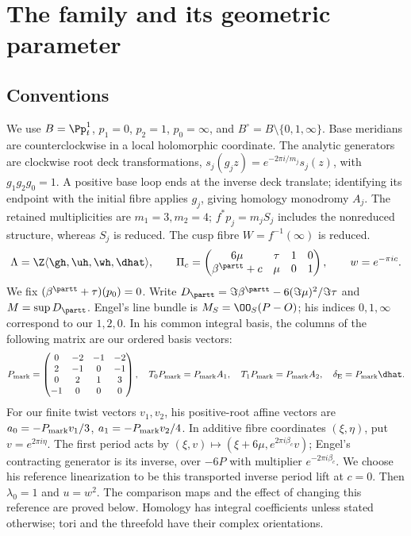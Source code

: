 \section{The family and its geometric parameter}\label{sec:family}
\subsection{Conventions}
\begin{definition}\label{def:conventions}
We use $B=\Pp^1_t$, $p_1=0$, $p_2=1$, $p_0=\infty$, and
$B^\circ=B\setminus\{0,1,\infty\}$. Base meridians are counterclockwise
in a local holomorphic coordinate. The analytic generators are clockwise
root deck transformations, $s_j(g_jz)=e^{-2\pi i/m_j}s_j(z)$, with
$g_1g_2g_0=1$. A positive base loop ends at the inverse deck translate;
identifying its endpoint with the initial fibre applies $g_j$, giving
homology monodromy $A_j$. The retained multiplicities are $m_1=3,m_2=4$;
$f^*p_j=m_jS_j$ includes the nonreduced structure, whereas $S_j$ is reduced.
The cusp fibre $W=f^{-1}(\infty)$ is reduced.
\[
 \Lambda=\Z\langle\gh,\uh,\wh,\dhat\rangle,\qquad
 \Pi_c=\begin{pmatrix}6\mu&\tau&1&0\\\beta^{\partt}+c&\mu&0&1\end{pmatrix},
 \qquad w=e^{-\pi ic}.
\]
We fix $(\beta^{\partt}+\tau)(p_0)=0$. Write
$D_{\partt}=\Im\beta^{\partt}-6(\Im\mu)^2/\Im\tau$ and
$M=\sup D_{\partt}$. Engel's line bundle is
$M_S=\OO_S(P-O)$; his indices $0,1,\infty$ correspond to our $1,2,0$.
In his common integral basis, the columns of the following matrix are
our ordered basis vectors:
\[
 P_{\rm mark}=\begin{pmatrix}
 0&-2&-1&-2\\2&-1&0&-1\\0&2&1&3\\-1&0&0&0
 \end{pmatrix},\quad
 T_0P_{\rm mark}=P_{\rm mark}A_1,\quad
 T_1P_{\rm mark}=P_{\rm mark}A_2,\quad
 \delta_{\rm E}=P_{\rm mark}\dhat.
\]
For our finite twist vectors $v_1,v_2$, his positive-root affine vectors
are $a_0=-P_{\rm mark}v_1/3$, $a_1=-P_{\rm mark}v_2/4$.
In additive fibre coordinates $(\xi,\eta)$, put $v=e^{2\pi i\eta}$.
The first period acts by
$(\xi,v)\mapsto(\xi+6\mu,e^{2\pi i\beta_c}v)$; Engel's contracting
generator is its inverse, over $-6P$ with multiplier $e^{-2\pi i\beta_c}$.
We choose his reference linearization to be this transported inverse
period lift at $c=0$. Then $\lambda_0=1$ and $u=w^2$.
The comparison maps and the effect of changing this reference are
proved below. Homology has integral coefficients unless stated
otherwise; tori and the threefold have their complex orientations.

\end{definition}

